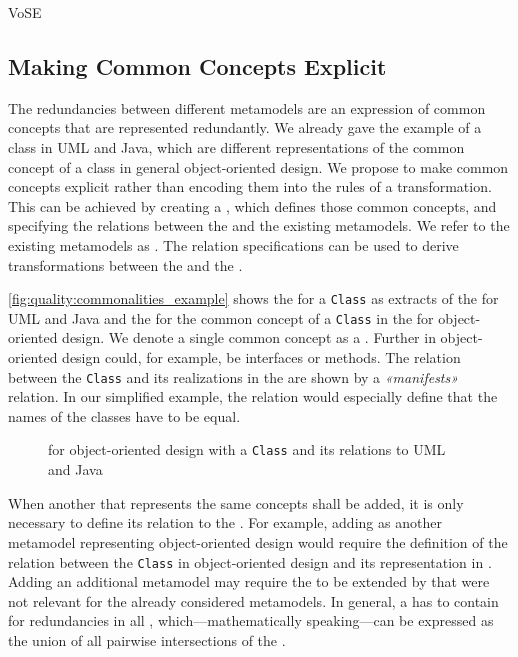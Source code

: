 \begin{copiedFrom}{VoSE}
\subsection{Making Common Concepts Explicit}

The redundancies between different metamodels are an expression of common concepts that are represented redundantly.
We already gave the example of a class in UML and Java, which are different representations of the common concept of a class in general object-oriented design.
We propose to make common concepts explicit rather than encoding them into the rules of a transformation.
This can be achieved by creating a \emph{\conceptmetamodel}, which defines those common concepts, and specifying the relations between the \conceptmetamodel and the existing metamodels.
We refer to the existing metamodels as \emph{\concretemetamodels}.
The relation specifications can be used to derive transformations between the \concretemetamodels and the \conceptmetamodel.

\autoref{fig:quality:commonalities_example} shows the \metaclasses for a \texttt{Class} as extracts of the \concretemetamodels for UML and Java and the \metaclass for the common concept of a \texttt{Class} in the \conceptmetamodel for object-oriented design.
We denote a single common concept as a \emph{\commonality}.
Further \commonalities in object-oriented design could, for example, be interfaces or methods.
The relation between the \texttt{Class} \commonality and its realizations in the \concretemetamodels are shown by a \emph{«manifests»} relation.
In our simplified example, the relation would especially define that the names of the classes have to be equal. %

\begin{figure}
    \centering
    
    \caption{\Conceptmetamodel for object-oriented design with a \texttt{Class} \commonality and its relations to UML and Java}
    \label{fig:quality:commonalities_example}
\end{figure}

When another \concretemetamodel that represents the same concepts shall be added, it is only necessary to define its relation to the \conceptmetamodel.
For example, adding \cplusplus as another metamodel representing object-oriented design would require the definition of the relation between the \texttt{Class} \commonality in object-oriented design and its representation in \cplusplus.
Adding an additional metamodel may require the \conceptmetamodel to be extended by \commonalities that were not relevant for the already considered metamodels.
In general, a \conceptmetamodel has to contain \commonalities for redundancies in all \concretemetamodels, which---mathematically speaking---can be expressed as the union of all pairwise intersections of the \concretemetamodels.


\end{copiedFrom}

